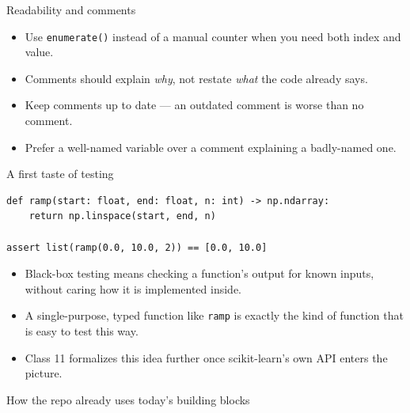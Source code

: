 \begin{frame}{Readability and comments}
\begin{itemize}
\item Use \texttt{enumerate()} instead of a manual counter when you need both index and value.
\item Comments should explain \emph{why}, not restate \emph{what} the code already says.
\item Keep comments up to date --- an outdated comment is worse than no comment.
\item Prefer a well-named variable over a comment explaining a badly-named one.
\end{itemize}
\coursefooter
\end{frame}

\begin{frame}[fragile]{A first taste of testing}
\begin{lstlisting}[style=coursepython]
def ramp(start: float, end: float, n: int) -> np.ndarray:
    return np.linspace(start, end, n)

assert list(ramp(0.0, 10.0, 2)) == [0.0, 10.0]
\end{lstlisting}
\begin{itemize}
\item Black-box testing means checking a function's output for known inputs, without caring how it is implemented inside.
\item A single-purpose, typed function like \texttt{ramp} is exactly the kind of function that is easy to test this way.
\item Class 11 formalizes this idea further once scikit-learn's own API enters the picture.
\end{itemize}
\coursefooter
\end{frame}

\begin{frame}{How the repo already uses today's building blocks}
\coursefooter
\end{frame}


